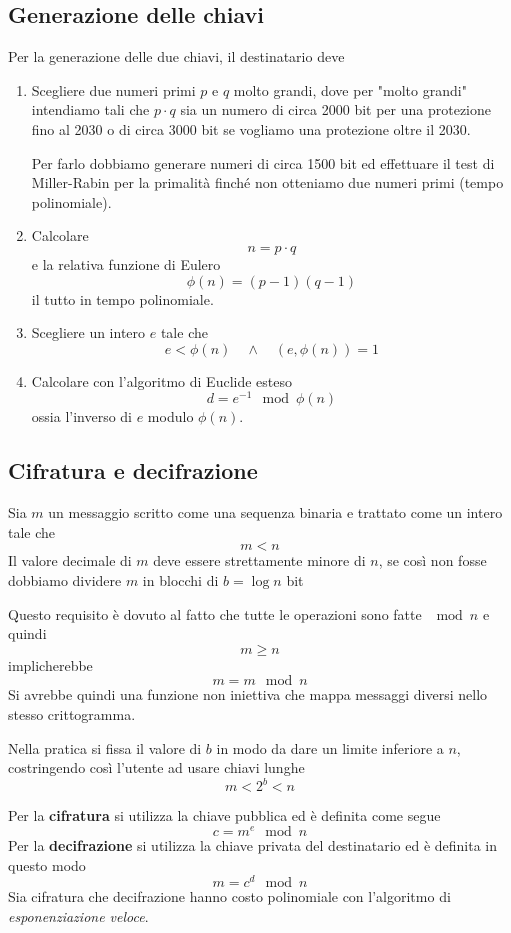 \subsection{Generazione delle chiavi}
Per la generazione delle due chiavi, il destinatario deve
\begin{enumerate}
	\item Scegliere due numeri primi $p$ e $q$ molto grandi, dove per "molto grandi" intendiamo tali che $p \cdot q$
	      sia un numero di circa 2000 bit per una protezione fino al 2030 o di circa 3000 bit se vogliamo una
	      protezione oltre il 2030.

	      Per farlo dobbiamo generare numeri di circa 1500 bit ed effettuare il test di Miller-Rabin per la
	      primalit\`a finch\'e non otteniamo due numeri primi (tempo polinomiale).
	\item Calcolare
	      \[ n = p \cdot q \]
	      e la relativa funzione di Eulero
	      \[ \phi(n) = (p - 1)(q - 1) \]
	      il tutto in tempo polinomiale.
	\item Scegliere un intero $e$ tale che
	      \[ e < \phi(n) \quad \wedge \quad (e, \phi(n)) = 1 \]
	\item Calcolare con l'algoritmo di Euclide esteso
	      \[ d = e^{-1} \mod{\phi(n)} \]
	      ossia l'inverso di $e$ modulo $\phi(n)$.
\end{enumerate}

\subsection{Cifratura e decifrazione}
Sia $m$ un messaggio scritto come una sequenza binaria e trattato come un intero tale che
\[ m < n \]
Il valore decimale di $m$ deve essere strettamente minore di $n$, se cos\`i non fosse dobbiamo dividere $m$ in
blocchi di $b = \log n$ bit

Questo requisito \`e dovuto al fatto che tutte le operazioni sono fatte $\mod{n}$ e quindi
\[ m \geq n \]
implicherebbe
\[ m = m \mod{n} \]
Si avrebbe quindi una funzione non iniettiva che mappa messaggi diversi nello stesso crittogramma.

Nella pratica si fissa il valore di $b$ in modo da dare un limite inferiore a $n$, costringendo cos\`i l'utente ad usare
chiavi lunghe
\[ m < 2^b < n \]

Per la \textbf{cifratura} si utilizza la chiave pubblica ed \`e definita come segue
\[ c = m^e \mod{n} \]
Per la \textbf{decifrazione} si utilizza la chiave privata del destinatario ed \`e definita in questo modo
\[ m = c^d \mod{n} \]
Sia cifratura che decifrazione hanno costo polinomiale con l'algoritmo di \emph{esponenziazione veloce}.

